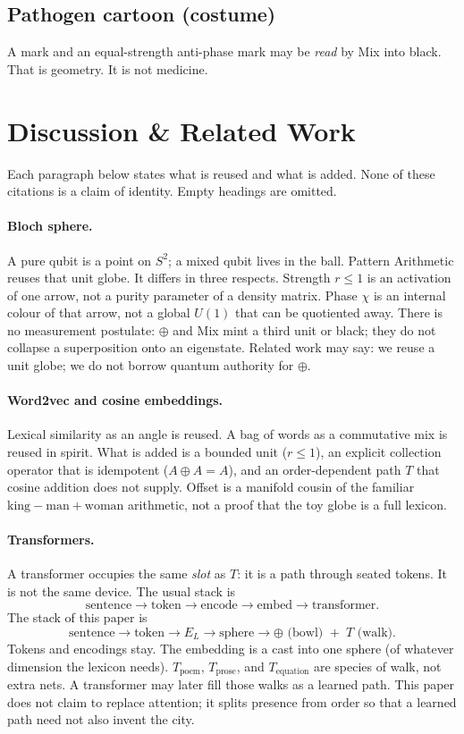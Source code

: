 \documentclass[12pt, a4paper]{article}
\begin{document}
\subsection{Pathogen cartoon (costume)}
A mark and an equal-strength anti-phase mark may be \emph{read}
by Mix into black. That is geometry. It is not medicine.

\section{Discussion \& Related Work}
\label{sec:related}

Each paragraph below states what is reused and what is added. None of
these citations is a claim of identity. Empty headings are omitted.

\paragraph{Bloch sphere.}
A pure qubit is a point on $S^2$; a mixed qubit lives in the ball.
Pattern Arithmetic reuses that unit globe. It differs in three
respects. Strength $r\le 1$ is an activation of one arrow, not a purity
parameter of a density matrix. Phase $\chi$ is an internal colour of
that arrow, not a global $U(1)$ that can be quotiented away. There is
no measurement postulate: $\oplus$ and Mix mint a third unit or black;
they do not collapse a superposition onto an eigenstate. Related work
may say: we reuse a unit globe; we do not borrow quantum authority for
$\oplus$.

\paragraph{Word2vec and cosine embeddings.}
Lexical similarity as an angle is reused. A bag of words as a
commutative mix is reused in spirit. What is added is a bounded unit
($r\le 1$), an explicit collection operator that is idempotent
($A\oplus A=A$), and an order-dependent path $T$ that cosine addition
does not supply. Offset is a manifold cousin of the familiar
$\mathrm{king}-\mathrm{man}+\mathrm{woman}$ arithmetic, not a proof
that the toy globe is a full lexicon.

\paragraph{Transformers.}
A transformer occupies the same \emph{slot} as $T$: it is a path
through seated tokens. It is not the same device. The usual stack is
\[
\text{sentence}\to\text{token}\to\text{encode}\to\text{embed}\to\text{transformer}.
\]
The stack of this paper is
\[
\text{sentence}\to\text{token}\to E_L\to\text{sphere}\to
\oplus\text{ (bowl) }+\; T\text{ (walk)}.
\]
Tokens and encodings stay. The embedding is a cast into one sphere
(of whatever dimension the lexicon needs). $T_{\mathrm{poem}}$,
$T_{\mathrm{prose}}$, and $T_{\mathrm{equation}}$ are species of
walk, not extra nets. A transformer may later fill those walks as a
learned path. This paper does not claim to replace attention; it
splits presence from order so that a learned path need not also
invent the city.
\end{document}
